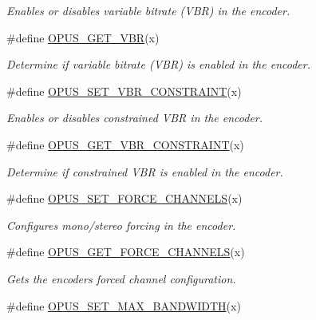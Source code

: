 \begin{DoxyCompactItemize}
\begin{DoxyCompactList}\small\item\em Enables or disables variable bitrate (V\+BR) in the encoder. \end{DoxyCompactList}\item 
\#define \hyperlink{group__opus__encoderctls_ga58feba30c167962305ec268e6abe8c08}{O\+P\+U\+S\+\_\+\+G\+E\+T\+\_\+\+V\+BR}(x)
\begin{DoxyCompactList}\small\item\em Determine if variable bitrate (V\+BR) is enabled in the encoder. \end{DoxyCompactList}\item 
\#define \hyperlink{group__opus__encoderctls_gab1b534a4fe55373f1be407ad4b2b22bd}{O\+P\+U\+S\+\_\+\+S\+E\+T\+\_\+\+V\+B\+R\+\_\+\+C\+O\+N\+S\+T\+R\+A\+I\+NT}(x)
\begin{DoxyCompactList}\small\item\em Enables or disables constrained V\+BR in the encoder. \end{DoxyCompactList}\item 
\#define \hyperlink{group__opus__encoderctls_gab35fa5691ba0dd932031b7839c47513c}{O\+P\+U\+S\+\_\+\+G\+E\+T\+\_\+\+V\+B\+R\+\_\+\+C\+O\+N\+S\+T\+R\+A\+I\+NT}(x)
\begin{DoxyCompactList}\small\item\em Determine if constrained V\+BR is enabled in the encoder. \end{DoxyCompactList}\item 
\#define \hyperlink{group__opus__encoderctls_ga8450a745bd919a8de522afec115f3b5f}{O\+P\+U\+S\+\_\+\+S\+E\+T\+\_\+\+F\+O\+R\+C\+E\+\_\+\+C\+H\+A\+N\+N\+E\+LS}(x)
\begin{DoxyCompactList}\small\item\em Configures mono/stereo forcing in the encoder. \end{DoxyCompactList}\item 
\#define \hyperlink{group__opus__encoderctls_ga21f010167c5dfa1b53f20c46d473e86a}{O\+P\+U\+S\+\_\+\+G\+E\+T\+\_\+\+F\+O\+R\+C\+E\+\_\+\+C\+H\+A\+N\+N\+E\+LS}(x)
\begin{DoxyCompactList}\small\item\em Gets the encoder\textquotesingle{}s forced channel configuration. \end{DoxyCompactList}\item 
\#define \hyperlink{group__opus__encoderctls_ga4f88288e89c595c07c61db316cc45289}{O\+P\+U\+S\+\_\+\+S\+E\+T\+\_\+\+M\+A\+X\+\_\+\+B\+A\+N\+D\+W\+I\+D\+TH}(x)

\end{DoxyCompactItemize}
